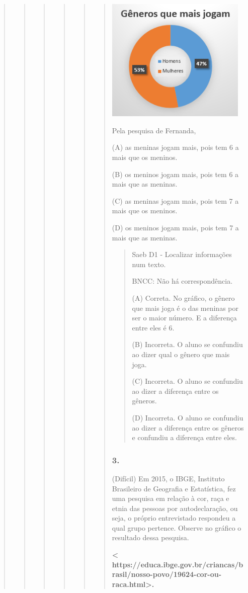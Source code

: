 \begin{quote}
\begin{quote}
\begin{quote}
\begin{quote}
\begin{quote}
\begin{quote}
\includegraphics[width=2.60244in,height=2.32558in]{media/image31.png}

Pela pesquisa de Fernanda,

(A) as meninas jogam mais, pois tem 6 a mais que os meninos.

(B) os meninos jogam mais, pois tem 6 a mais que as meninas.

(C) as meninas jogam mais, pois tem 7 a mais que os meninos.

(D) os meninos jogam mais, pois tem 7 a mais que as meninas.

\begin{quote}
Saeb D1 - Localizar informações num texto.

BNCC: Não há correspondência.

(A) Correta. No gráfico, o gênero que mais joga é o das meninas por ser
o maior número. E a diferença entre eles é 6.

(B) Incorreta. O aluno se confundiu ao dizer qual o gênero que mais
joga.

(C) Incorreta. O aluno se confundiu ao dizer a diferença entre os
gêneros.

(D) Incorreta. O aluno se confundiu ao dizer a diferença entre os
gêneros e confundiu a diferença entre eles.
\end{quote}

\subsubsection{3. }\label{section-70}

(Difícil) Em 2015, o IBGE, Instituto Brasileiro de Geografia e
Estatística, fez uma pesquisa em relação à cor, raça e etnia das pessoas
por autodeclaração, ou seja, o próprio entrevistado respondeu a qual
grupo pertence. Observe no gráfico o resultado dessa pesquisa.

\textbf{\textless{}
https://educa.ibge.gov.br/criancas/brasil/nosso-povo/19624-cor-ou-raca.html\textgreater{}.
}


\end{quote}
\end{quote}
\end{quote}
\end{quote}
\end{quote}
\end{quote}
